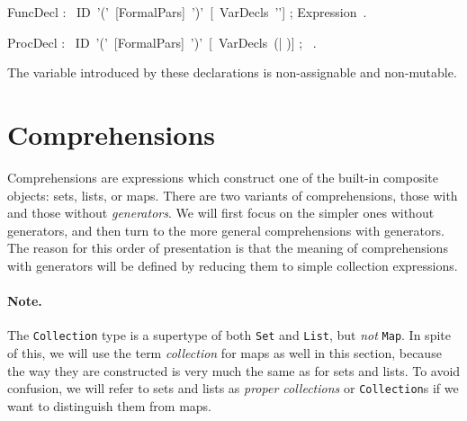 
\bgr
FuncDecl : \kwFunction~ID~'('~[FormalPars]~')'~[\kwVar~VarDecls~'\charColon'] ;
    Expression~\kwEnd .

ProcDecl : \kwProcedure~ID~'('~[FormalPars]~')'~[\kwVar~VarDecls~(\kwBegin | \kwDo)] ;
    ~\kwEnd .
\egr

The variable introduced by these declarations is non-assignable and non-mutable.





\section{Comprehensions}\label{sect:Comprehensions}



Comprehensions are expressions which construct one of the built-in
composite objects: sets, lists, or maps. There are two variants of
comprehensions, those with and those without {\em generators}. We will
first focus on the simpler ones without generators, and then turn to
the more general comprehensions with generators. The reason for this
order of presentation is that the meaning of comprehensions with
generators will be defined by reducing them to simple collection
expressions.


\paragraph{Note.} The {\tt Collection} type is a supertype of both
{\tt Set} and {\tt List}, but {\em not} {\tt Map}. In spite of this,
we will use the term {\em collection} for maps as well in this
section, because the way they are constructed is very much the same as
for sets and lists. To avoid confusion, we will refer to sets and
lists as {\em proper collections} or {\tt Collection}s if we want to
distinguish them from maps.

